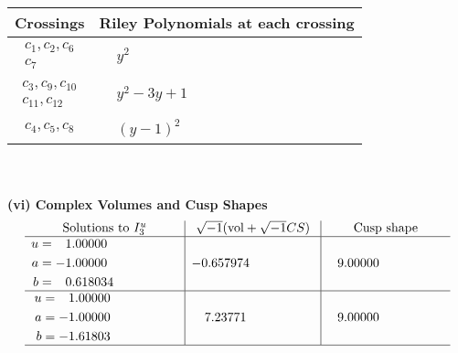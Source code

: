 \documentclass[1p]{elsarticle_modified}
\theoremstyle{definition}
\newcommand{\I}{\sqrt{-1}}
\begin{document}
\begin{tabular}{m{50pt}|m{274pt}}
Crossings & \hspace{64pt}Riley Polynomials at each crossing \\
\hline $$\begin{aligned}c_{1},c_{2},c_{6}\\c_{7}\end{aligned}$$&$\begin{aligned}
&y^2
\end{aligned}$\\
\hline $$\begin{aligned}c_{3},c_{9},c_{10}\\c_{11},c_{12}\end{aligned}$$&$\begin{aligned}
&y^2-3 y+1
\end{aligned}$\\
\hline $$\begin{aligned}c_{4},c_{5},c_{8}\end{aligned}$$&$\begin{aligned}
&(y-1)^2
\end{aligned}$\\
\hline
\end{tabular}\\~\\
\newpage\flushleft \textbf{(vi) Complex Volumes and Cusp Shapes}
$$\begin{array}{c|c|c}  
\text{Solutions to }I^u_{3}& \I (\text{vol} + \sqrt{-1}CS) & \text{Cusp shape}\\
 \hline 
\begin{aligned}
u &= \phantom{-}1.00000\phantom{ +0.000000I} \\
a &= -1.00000\phantom{ +0.000000I} \\
b &= \phantom{-}0.618034\phantom{ +0.000000I}\end{aligned}
 & -0.657974\phantom{ +0.000000I} & \phantom{-}9.00000\phantom{ +0.000000I} \\ \hline\begin{aligned}
u &= \phantom{-}1.00000\phantom{ +0.000000I} \\
a &= -1.00000\phantom{ +0.000000I} \\
b &= -1.61803\phantom{ +0.000000I}\end{aligned}
 & \phantom{-}7.23771\phantom{ +0.000000I} & \phantom{-}9.00000\phantom{ +0.000000I}\\
 \hline 
 \end{array}$$\newpage
\newpage\renewcommand{\arraystretch}{1}
\end{document}

